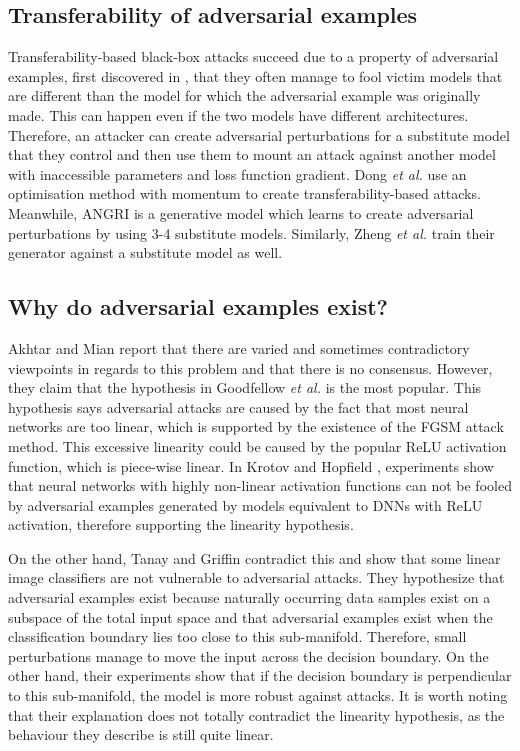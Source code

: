 \subsection{Transferability of adversarial examples}

Transferability-based black-box attacks succeed due to a property of adversarial examples, first discovered in \cite{szegedy2014intriguing}, that they often manage to fool victim models that are different than the model for which the adversarial example was originally made. This can happen even if the two models have different architectures. Therefore, an attacker can create adversarial perturbations for a substitute model that they control and then use them to mount an attack against another model with inaccessible parameters and loss function gradient. Dong \textit{et al.} \cite{mim} use an optimisation method with momentum to create transferability-based attacks. Meanwhile, ANGRI \cite{upset_angri} is a generative model which learns to create adversarial perturbations by using 3-4 substitute models. Similarly, Zheng \textit{et al.} \cite{zheng_black_box_GAN} train their generator against a substitute model as well.

\subsection{Why do adversarial examples exist?}

Akhtar and Mian \cite{akhtar} report that there are varied and sometimes contradictory viewpoints in regards to this problem and that there is no consensus. However, they claim that the hypothesis in Goodfellow \textit{et al.} \cite{fgsm} is the most popular. This hypothesis says adversarial attacks are caused by the fact that most neural networks are too linear, which is supported by the existence of the FGSM \cite{fgsm} attack method. This excessive linearity could be caused by the popular ReLU activation function, which is piece-wise linear. In Krotov and Hopfield \cite{krotov2018dam}, experiments show that neural networks with highly non-linear activation functions can not be fooled by adversarial examples generated by models equivalent to DNNs with ReLU activation, therefore supporting the linearity hypothesis. 

On the other hand, Tanay and Griffin \cite{tanay2016boundary} contradict this and show that some linear image classifiers are not vulnerable to adversarial attacks. They hypothesize that adversarial examples exist because naturally occurring data samples exist on a subspace of the total input space and that adversarial examples exist when the classification boundary lies too close to this sub-manifold. Therefore, small perturbations manage to move the input across the decision boundary. On the other hand, their experiments show that if the decision boundary is perpendicular to this sub-manifold, the model is more robust against attacks. It is worth noting that their explanation does not totally contradict the linearity hypothesis, as the behaviour they describe is still quite linear.

